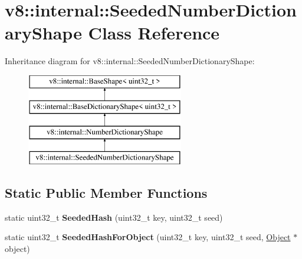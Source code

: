 \hypertarget{classv8_1_1internal_1_1_seeded_number_dictionary_shape}{}\section{v8\+:\+:internal\+:\+:Seeded\+Number\+Dictionary\+Shape Class Reference}
\label{classv8_1_1internal_1_1_seeded_number_dictionary_shape}
Inheritance diagram for v8\+:\+:internal\+:\+:Seeded\+Number\+Dictionary\+Shape\+:\begin{figure}[H]
\begin{center}
\leavevmode
\includegraphics[height=4.000000cm]{classv8_1_1internal_1_1_seeded_number_dictionary_shape}
\end{center}
\end{figure}
\subsection*{Static Public Member Functions}
\begin{DoxyCompactItemize}
\item 
static uint32\+\_\+t {\bfseries Seeded\+Hash} (uint32\+\_\+t key, uint32\+\_\+t seed)\hypertarget{classv8_1_1internal_1_1_seeded_number_dictionary_shape_ae412ed359bf25f7fd1fd7573262e76c1}{}\label{classv8_1_1internal_1_1_seeded_number_dictionary_shape_ae412ed359bf25f7fd1fd7573262e76c1}

\item 
static uint32\+\_\+t {\bfseries Seeded\+Hash\+For\+Object} (uint32\+\_\+t key, uint32\+\_\+t seed, \hyperlink{classv8_1_1internal_1_1_object}{Object} $\ast$object)\hypertarget{classv8_1_1internal_1_1_seeded_number_dictionary_shape_aa7de6722f382f2fbb291f25d0d025128}{}\label{classv8_1_1internal_1_1_seeded_number_dictionary_shape_aa7de6722f382f2fbb291f25d0d025128}

\end{DoxyCompactItemize}
